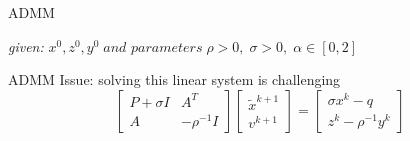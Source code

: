 \documentclass[10pt]{beamer}
\begin{document}
\begin{frame}[fragile]{ADMM}
\begin{algorithm}[H]
\SetAlgoLined
\textit{given:}
 $x^0, z^0, y^0 \; \textit{and parameters} \;\rho >0, \; \sigma >0, \; \alpha \in [0,2]$
 \\  \caption{ADMM algorithm as presented in \cite{osqp}}
\end{algorithm}
\end{frame}

\begin{frame}[fragile]{ADMM}
Issue: solving this linear system is challenging
\begin{equation}
\begin{bmatrix}
P+\sigma I & A^T\\
A & -\rho^{-1}I  
\end{bmatrix}
\begin{bmatrix}
\tilde{x}^{k+1}\\
v^{k+1}
\end{bmatrix}
= \begin{bmatrix}
\sigma x^k - q\\
z^k - \rho^{-1}y^k
\end{bmatrix}
\end{equation}
\end{frame}
\end{document}
